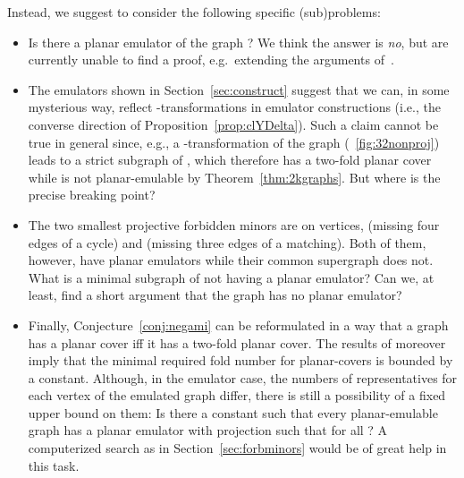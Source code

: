 \documentclass[envcountsect,envcountsame]{llncs}
\begin{document}
Instead, we suggest to consider the following specific (sub)problems:
\begin{itemize}\parskip2pt
\item
Is there a planar emulator of the graph ?
We think the answer is {\em no}, but are currently unable to find a proof,
e.g.\ extending the arguments of~\cite{cit:k44-e}.
\item
The emulators shown in Section~\ref{sec:construct} suggest that
we can, in some mysterious way, reflect -transformations in
emulator constructions (i.e., the converse direction of
Proposition~\ref{prop:clYDelta}).
Such a claim cannot be true in general since, e.g.,
a -transformation of the graph 
(\figurename~\ref{fig:32nonproj}) leads to a strict subgraph of ,
which therefore has a two-fold planar cover while  is not
planar-emulable by Theorem~\ref{thm:2kgraphs}.
But where is the precise breaking point?
\item
The two smallest projective forbidden minors are on 
vertices,  (missing four edges of a cycle) 
and  (missing three edges of a matching).
Both of them, however, have planar emulators while their common supergraph
 does not.
What is a minimal subgraph of  not having a planar emulator?
Can we, at least, find a short argument that the graph  has no planar
emulator?
\item
Finally, Conjecture~\ref{conj:negami} can be reformulated in a way that a
graph has a planar cover iff it has a two-fold planar cover.
The results of \cite{cit:counterex} moreover imply that the minimal
required fold number for planar-covers is bounded by a constant.
Although, in the emulator case, the numbers of representatives for each
vertex of the emulated graph differ, there is still a possibility of a fixed
upper bound on them:
Is there a constant  such that every planar-emulable graph  has a
planar emulator with projection  such that  for
all ?
A computerized search as in Section~\ref{sec:forbminors} would be of great
help in this task.
\end{itemize}
\end{document}
